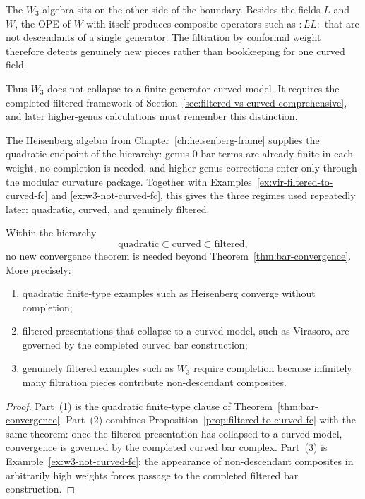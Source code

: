 \begin{example}\label{ex:w3-not-curved-fc}
The $W_3$ algebra sits on the other side of the boundary.  Besides the fields
$L$ and $W$, the OPE of $W$ with itself produces composite operators such as
${:}LL{:}$ that are not descendants of a single generator.  The filtration by
conformal weight therefore detects genuinely new pieces rather than bookkeeping
for one curved field.

Thus $W_3$ does not collapse to a finite-generator curved model.  It requires
the completed filtered framework of Section~\ref{sec:filtered-vs-curved-comprehensive},
and later higher-genus calculations must remember this distinction.
\end{example}

\begin{example}
The Heisenberg algebra from Chapter~\ref{ch:heisenberg-frame} supplies the
quadratic endpoint of the hierarchy: genus-$0$ bar terms are already finite in
each weight, no completion is needed, and higher-genus corrections enter only
through the modular curvature package.  Together with
Examples~\ref{ex:vir-filtered-to-curved-fc} and
\ref{ex:w3-not-curved-fc}, this gives the three regimes used repeatedly later:
quadratic, curved, and genuinely filtered.
\end{example}

\begin{theorem}\label{thm:bar-convergence-fc}
Within the hierarchy
\[
\text{quadratic} \subset \text{curved} \subset \text{filtered},
\]
no new convergence theorem is needed beyond
Theorem~\ref{thm:bar-convergence}.  More precisely:
\begin{enumerate}
\item quadratic finite-type examples such as Heisenberg converge without
  completion;
\item filtered presentations that collapse to a curved model, such as Virasoro,
  are governed by the completed curved bar construction;
\item genuinely filtered examples such as $W_3$ require completion because
  infinitely many filtration pieces contribute non-descendant composites.
\end{enumerate}
\end{theorem}

\begin{proof}
Part~(1) is the quadratic finite-type clause of
Theorem~\ref{thm:bar-convergence}.  Part~(2) combines
Proposition~\ref{prop:filtered-to-curved-fc} with the same theorem: once the
filtered presentation has collapsed to a curved model, convergence is governed
by the completed curved bar complex.  Part~(3) is Example~\ref{ex:w3-not-curved-fc}:
the appearance of non-descendant composites in arbitrarily high weights forces
passage to the completed filtered bar construction.
\end{proof}

